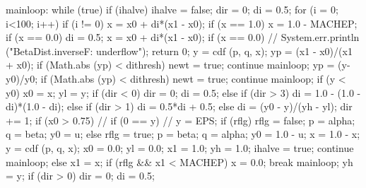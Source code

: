 \begin{code}
\begin{hide}
{mainloop:
      while (true) {
         if (ihalve) {
            ihalve = false;
            dir = 0;
            di = 0.5;
            for (i = 0; i<100; i++) {
               if (i != 0) {
                  x = x0  +  di*(x1 - x0);
                  if (x == 1.0)
                     x = 1.0 - MACHEP;
                  if (x == 0.0) {
                     di = 0.5;
                     x = x0  +  di*(x1 - x0);
                     if (x == 0.0) {
                        // System.err.println ("BetaDist.inverseF: underflow");
                        return 0;
                     }
                  }
                  y = cdf (p, q, x);
                  yp = (x1 - x0)/(x1 + x0);
                  if (Math.abs (yp) < dithresh) {
                     newt = true;
                     continue mainloop;
                  }
                  yp = (y-y0)/y0;
                  if (Math.abs (yp) < dithresh) {
                     newt = true;
                     continue mainloop;
                  }
               }
               if (y < y0) {
                  x0 = x;
                  yl = y;
                  if (dir < 0) {
                     dir = 0;
                     di = 0.5;
                  }
                  else if (dir > 3)
                     di = 1.0 - (1.0 - di)*(1.0 - di);
                  else if (dir > 1)
                     di = 0.5*di + 0.5;
                  else
                     di = (y0 - y)/(yh - yl);
                  dir += 1;
                  if (x0 > 0.75) {
                  // if (0 == y)
                  //    y = EPS;
                     if (rflg) {
                        rflg = false;
                        p = alpha;
                        q = beta;
                        y0 = u;
                     }
                     else {
                        rflg = true;
                        p = beta;
                        q = alpha;
                        y0 = 1.0 - u;
                     }
                     x = 1.0 - x;
                     y = cdf (p, q, x);
                     x0 = 0.0;
                     yl = 0.0;
                     x1 = 1.0;
                     yh = 1.0;
                     ihalve = true;
                     continue mainloop;
                  }
               }
               else {
                  x1 = x;
                  if (rflg && x1 < MACHEP) {
                     x = 0.0;
                     break mainloop;
                  }
                  yh = y;
                  if (dir > 0) {
                     dir = 0;
                     di = 0.5;
                  }
}}}}}
\end{hide}
\end{code}

